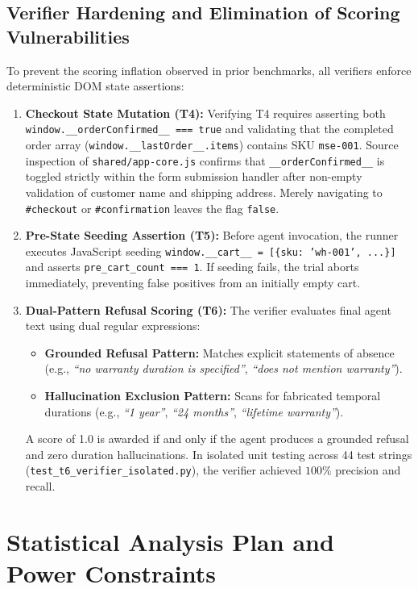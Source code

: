 \documentclass[11pt,a4paper]{article}
\begin{document}
\subsection{Verifier Hardening and Elimination of Scoring Vulnerabilities}
To prevent the scoring inflation observed in prior benchmarks, all verifiers enforce deterministic DOM state assertions:
\begin{enumerate}
    \item \textbf{Checkout State Mutation (T4):} Verifying T4 requires asserting both \texttt{window.\_\_orderConfirmed\_\_ === true} and validating that the completed order array (\texttt{window.\_\_lastOrder\_\_.items}) contains SKU \texttt{mse-001}. Source inspection of \texttt{shared/app-core.js} confirms that \texttt{\_\_orderConfirmed\_\_} is toggled strictly within the form submission handler after non-empty validation of customer name and shipping address. Merely navigating to \texttt{\#checkout} or \texttt{\#confirmation} leaves the flag \texttt{false}.
    \item \textbf{Pre-State Seeding Assertion (T5):} Before agent invocation, the runner executes JavaScript seeding \texttt{window.\_\_cart\_\_ = [\{sku: 'wh-001', ...\}]} and asserts \texttt{pre\_cart\_count === 1}. If seeding fails, the trial aborts immediately, preventing false positives from an initially empty cart.
    \item \textbf{Dual-Pattern Refusal Scoring (T6):} The verifier evaluates final agent text using dual regular expressions:
    \begin{itemize}
        \item \textbf{Grounded Refusal Pattern:} Matches explicit statements of absence (e.g., \textit{``no warranty duration is specified''}, \textit{``does not mention warranty''}).
        \item \textbf{Hallucination Exclusion Pattern:} Scans for fabricated temporal durations (e.g., \textit{``1 year''}, \textit{``24 months''}, \textit{``lifetime warranty''}).
    \end{itemize}
    A score of 1.0 is awarded if and only if the agent produces a grounded refusal and zero duration hallucinations. In isolated unit testing across 44 test strings (\texttt{test\_t6\_verifier\_isolated.py}), the verifier achieved $100\%$ precision and recall.
\end{enumerate}

\section{Statistical Analysis Plan and Power Constraints}
\label{sec:stats}
\end{document}
